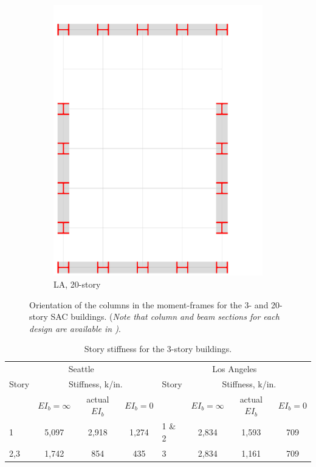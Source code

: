 \documentclass{simcenterdocumentation}
\begin{document}
\begin{figure}[H]
\begin{subfigure}[b]{0.24\linewidth}
		\centering \includegraphics[page=4,trim=0mm 0mm 90mm 100mm,clip,scale=0.2]{moment_frames.pdf}
		\caption{LA, 20-story}
	\end{subfigure}
	\caption{Orientation of the columns in the moment-frames for the 3- and 20-story SAC buildings. (\textit{Note that column and beam sections for each design are available in \cite{FEMA335c2000})}.}
	\label{fig:cols_orientation}
\end{figure}


\begin{table}[H]
	\centering \caption{Story stiffness for the 3-story buildings.}
	\label{tab:stiffness_3LASE}
	\begin{tabular}{lccclccc}
	\toprule
	\multicolumn{4}{c}{Seattle}											&	\multicolumn{4}{c}{Los Angeles}	\\ \cmidrule(rl){1-4} \cmidrule(rl){5-8}
	Story	& \multicolumn{3}{c}{Stiffness, k/in.}						&	Story	& \multicolumn{3}{c}{Stiffness, k/in.}	\\ \cmidrule(rl){2-4}\cmidrule(rl){6-8}
			& $EI_b = \infty$	& actual $EI_b$		& $EI_b = 0$		&			& $EI_b = \infty$	& actual $EI_b$		& $EI_b = 0$		\\ \cmidrule(rl){1-4} \cmidrule(rl){5-8}
	1		& 5,097				& 2,918				& 1,274				& 1 \& 2	& 2,834				& 1,593				& 709				\\
	2,3		& 1,742				& 854				& 435				& 3			& 2,834				& 1,161				& 709				\\ \bottomrule
	\end{tabular}
\end{table}
\end{document}
